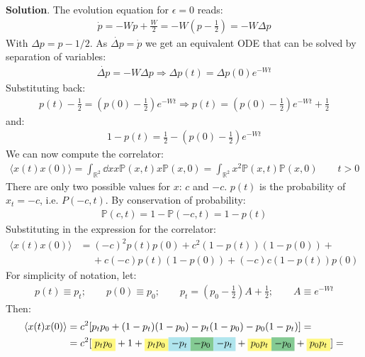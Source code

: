 \documentclass[../template.tex]{subfiles}
\begin{document}
\begin{exo}
    \textbf{Solution}. 
    The evolution equation for $\epsilon = 0$ reads:
    \begin{align*}
        \dot{p} = - Wp + \frac{W}{2} = -W\left(p-\frac{1}{2} \right) = -W \Delta p
    \end{align*}
    With $\Delta p = p-1/2$. As $\dot{\Delta p} = \dot{p}$ we get an equivalent ODE that can be solved by separation of variables:
    \begin{align*}
        \dot{\Delta p} = - W \Delta p \Rightarrow \Delta p(t) = \Delta p(0) e^{-Wt}
    \end{align*}
    Substituting back:
    \begin{align*}
        p(t) - \frac{1}{2} = \left(p(0) - \frac{1}{2} \right)  e^{-Wt} \Rightarrow p(t) = \left(p(0)-\frac{1}{2} \right)e^{-Wt} + \frac{1}{2} 
    \end{align*}
    and:
    \begin{align*}
        1-p(t) = \frac{1}{2}  - \left(p(0)-\frac{1}{2} \right)e^{-Wt}
    \end{align*}
    We can now compute the correlator:
    \begin{align*}
        \langle x(t) x(0) \rangle = \int_{\mathbb{R}^2} \dd{x} x \mathbb{P}(x,t) x \mathbb{P}(x,0) = \int_{\mathbb{R}^2} x^2 \mathbb{P}(x,t) \mathbb{P}(x,0) \qquad t>0
    \end{align*}
    There are only two possible values for $x$: $c$ and $-c$. $p(t)$ is the probability of $x_t = -c$, i.e. $P(-c,t)$. By conservation of probability:
    \begin{align*}
        \mathbb{P}(c,t) = 1-\mathbb{P}(-c,t) = 1-p(t)
    \end{align*}
    Substituting in the expression for the correlator:
    \begin{align*}
        \langle x(t) x(0) \rangle &= (-c)^2 p(t)p(0) + c^2(1-p(t))(1-p(0)) +\\
        &\quad \> + c(-c)p(t)(1-p(0)) + (-c)c(1-p(t))p(0)
    \end{align*}
    For simplicity of notation, let:
    \begin{align*}
        p(t) \equiv p_t; \qquad p(0) \equiv p_0; \qquad p_t=\left(p_0-\frac{1}{2} \right)A + \frac{1}{2}; \qquad A\equiv e^{-Wt} 
    \end{align*}
    Then:
    \begin{align*}
        \langle x(t) x(0) \rangle &= c^2[p_t p_0 + (1-p_t)(1-p_0) -p_t(1-p_0) - p_0(1-p_t)]=\\
        &= c^2[\hlc{Yellow}{p_t p_0} + 1 + \hlc{Yellow}{p_tp_0 }\hlc{SkyBlue}{- p_t }\hlc{ForestGreen}{-p_0} \hlc{SkyBlue}{-p_t }+ \hlc{Yellow}{p_0 p_t} \hlc{ForestGreen}{-p_0} + \hlc{Yellow}{p_0p_t}] =\\

\end{align*}
\end{exo}
\end{document}

